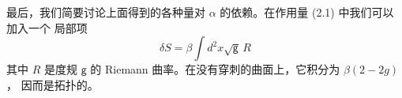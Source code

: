 最后，我们简要讨论上面得到的各种量对 $\alpha$ 的依赖。在作用量 (2.1) 中我们可以加入一个
局部项
\begin{equation}
  \delta S=\beta\int d^2x\sqrt{\mathsf{g}}\,R
  \tag{2.18}
\end{equation}
其中 $R$ 是度规 $\mathsf{g}$ 的 Riemann 曲率。在没有穿刺的曲面上，它积分为 $\beta(2-2g)$，
因而是拓扑的。
